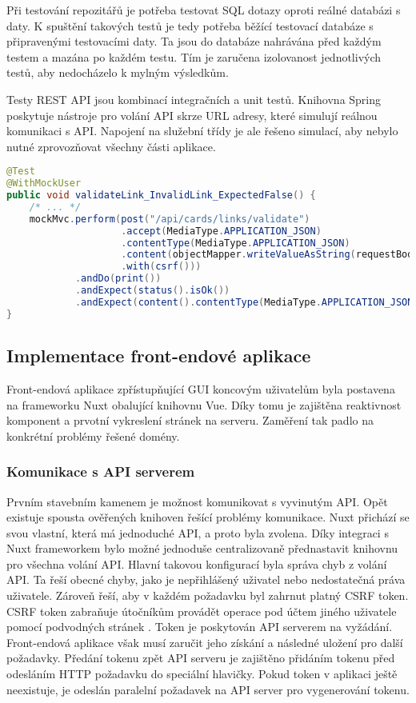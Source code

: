 		Při testování repozitářů je potřeba testovat \ac{SQL} dotazy oproti reálné databázi s daty.
		K spuštění takových testů je tedy potřeba běžící testovací databáze s připravenými testovacími daty.
		Ta jsou do databáze nahrávána před každým testem a mazána po každém testu.
		Tím je zaručena izolovanost jednotlivých testů, aby nedocházelo k mylným výsledkům.

		Testy \ac{REST} \ac{API} jsou kombinací integračních a unit testů.
		Knihovna Spring poskytuje nástroje pro volání \ac{API} skrze \ac{URL} adresy, které simulují reálnou komunikaci
		s \ac{API}.
		Napojení na služební třídy je ale řešeno simulací, aby nebylo nutné zprovozňovat všechny části
		aplikace.

		\begin{lstlisting}[language=Java, caption={Ukázka testu volání API validující odkaz. Zdroj: [autor]}]
@Test
@WithMockUser
public void validateLink_InvalidLink_ExpectedFalse() {
	/* ... */
	mockMvc.perform(post("/api/cards/links/validate")
					.accept(MediaType.APPLICATION_JSON)
					.contentType(MediaType.APPLICATION_JSON)
					.content(objectMapper.writeValueAsString(requestBody))
					.with(csrf()))
			.andDo(print())
			.andExpect(status().isOk())
			.andExpect(content().contentType(MediaType.APPLICATION_JSON));
}
		\end{lstlisting}

	\subsection{Implementace front-endové aplikace}

	Front-endová aplikace zpřístupňující \ac{GUI} koncovým uživatelům byla postavena na frameworku
	Nuxt obalující knihovnu Vue.
	Díky tomu je zajištěna reaktivnost komponent a prvotní vykreslení stránek na serveru.
	Zaměření tak padlo na konkrétní problémy řešené domény.

		\subsubsection{Komunikace s API serverem}

		Prvním stavebním kamenem je možnost komunikovat s vyvinutým \ac{API}.
		Opět existuje spousta ověřených knihoven řešící problémy komunikace.
		Nuxt přichází se svou vlastní, která má jednoduché \ac{API}, a proto byla zvolena.
		Díky integraci s Nuxt frameworkem bylo možné jednoduše centralizovaně přednastavit knihovnu pro všechna volání \ac{API}.
		Hlavní takovou konfigurací byla správa chyb z volání \ac{API}.
		Ta řeší obecné chyby, jako je nepřihlášený uživatel nebo nedostatečná práva uživatele.
		Zároveň řeší, aby v každém požadavku byl zahrnut platný \ac{CSRF} token.
		\ac{CSRF} token zabraňuje útočníkům provádět operace pod účtem jiného uživatele pomocí podvodných stránek \cite{csrf}.
		Token je poskytován \ac{API} serverem na vyžádání.
		Front-endová aplikace však musí zaručit jeho získání a následné uložení pro další požadavky.
		Předání tokenu zpět \ac{API} serveru je zajištěno přidáním tokenu před odesláním \ac{HTTP} požadavku do speciální hlavičky.
		Pokud token v aplikaci ještě neexistuje, je odeslán paralelní požadavek na \ac{API} server pro vygenerování tokenu.

